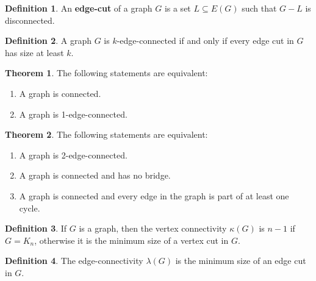 \documentclass{article}
\theoremstyle{definition}
\newtheorem{theorem}{Theorem}
\newtheorem{definition}{Definition}
\begin{document}
\begin{definition}
An \textbf{edge-cut} of a graph $G$ is a set $L \subseteq E(G)$ such that $G - L$ is disconnected.
\end{definition}

\begin{definition}
A graph $G$ is $k$-edge-connected if and only if every edge cut in $G$ has size at least $k$.
\end{definition}

\begin{theorem}
The following statements are equivalent:
\begin{enumerate}
\item A graph is connected.
\item A graph is 1-edge-connected.
\end{enumerate}
\end{theorem}

\begin{theorem}
The following statements are equivalent:
\begin{enumerate}
\item A graph is 2-edge-connected.
\item A graph is connected and has no bridge.
\item A graph is connected and every edge in the graph is part of at least one cycle.
\end{enumerate}
\end{theorem}

\begin{definition}
If $G$ is a graph, then the vertex connectivity $\kappa(G)$ is $n-1$ if $G = K_n$, otherwise it is the minimum size of a vertex cut in $G$.
\end{definition}

\begin{definition}
The edge-connectivity $\lambda(G)$ is the minimum size of an edge cut in $G$.
\end{definition}
\end{document}
